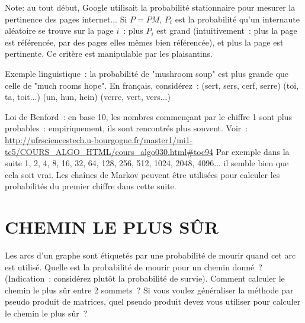 \documentclass[a4paper]{article}
\begin{document}
Note: au tout d\'ebut, Google utilisait la probabilit\'e stationnaire pour mesurer la pertinence des pages internet... Si $P=PM$, $P_i$ est la probabilit\'e qu'un internaute al\'eatoire se trouve sur la page $i$~: plus $P_i$ est grand (intuitivement~: plus la page est r\'ef\'erenc\'ee, par des pages elles m\^emes bien r\'ef\'erenc\'ee), et plus la page est pertinente. Ce crit\`ere
est manipulable par les plaisantins.


Exemple linguistique~: la probabilit\'e de "mushroom soup" est plus grande que celle de "much rooms hope".
En fran\c{c}ais, consid\'erez~: (sert, sers, cerf, serre) (toi, ta, toit...) (un, hun, hein) (verre, vert, vers...)

Loi de Benford~: en base 10, les nombres commen\c{c}ant par le chiffre 1 sont plus probables~:
empiriquement, ils sont rencontr\'es plus souvent. Voir~:
\url{http://ufrsciencestech.u-bourgogne.fr/master1/mi1-tc5/COURS_ALGO_HTML/cours_algo030.html#toc94}
Par exemple dans la suite 1, 2, 4, 8, 16, 32, 64, 128, 256, 512, 1024, 2048, 4096... il
semble bien que cela soit vrai.
Les cha\^ines de Markov peuvent \^etre utilis\'ees pour calculer les probabilit\'es du premier chiffre dans cette suite.

\section{CHEMIN LE PLUS S\^UR}
Les arcs d'un graphe sont \'etiquet\'es par une probabilit\'e de mourir quand cet
arc est utilis\'e. Quelle est la probabilit\'e de mourir pour un chemin donn\'e~? (Indication~: consid\'erez plut\^ot la probabilit\'e de survie).
Comment calculer le chemin le plus s\^ur entre 2 sommets~? 
Si vous voulez g\'en\'eraliser la m\'ethode par pseudo produit de matrices, quel
pseudo produit devez vous utiliser pour calculer le chemin le plus s\^ur~?
\end{document}

